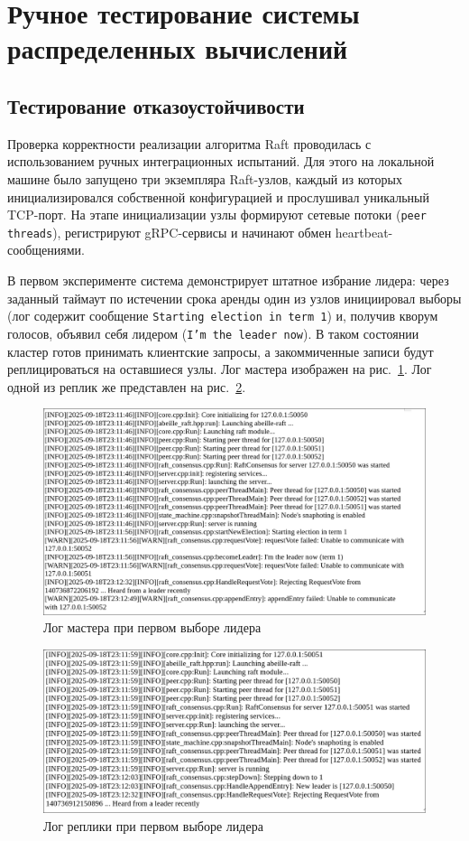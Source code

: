\section{Ручное тестирование системы распределенных вычислений}

\subsection{Тестирование отказоустойчивости}

Проверка корректности реализации алгоритма Raft проводилась с использованием
ручных интеграционных испытаний. Для этого на локальной машине было запущено
три экземпляра Raft-узлов, каждый из которых инициализировался собственной
конфигурацией и прослушивал уникальный TCP-порт. На этапе инициализации узлы
формируют сетевые потоки (\texttt{peer threads}), регистрируют gRPC-сервисы и
начинают обмен heartbeat-сообщениями.

В первом эксперименте система демонстрирует штатное избрание лидера:
через заданный таймаут по истечении срока аренды один из узлов инициировал
выборы (лог содержит сообщение \texttt{Starting election in term 1}) и,
получив кворум голосов, объявил себя лидером (\texttt{I'm the leader now}).
В таком состоянии кластер готов принимать клиентские запросы, а
закоммиченные записи будут реплицироваться на оставшиеся узлы. Лог мастера
изображен на рис.~\ref{fig:leader_log}. Лог одной из реплик же представлен
на рис.~\ref{fig:replica_log}.

\begin{figure}
  \centering
  \includegraphics[scale=0.4]{inc/leader-log.png}
  \caption{Лог мастера при первом выборе лидера}
  \label{fig:leader_log}
\end{figure}

\begin{figure}
  \centering
  \includegraphics[scale=0.4]{inc/replica-log.png}
  \caption{Лог реплики при первом выборе лидера}
  \label{fig:replica_log}
\end{figure}

